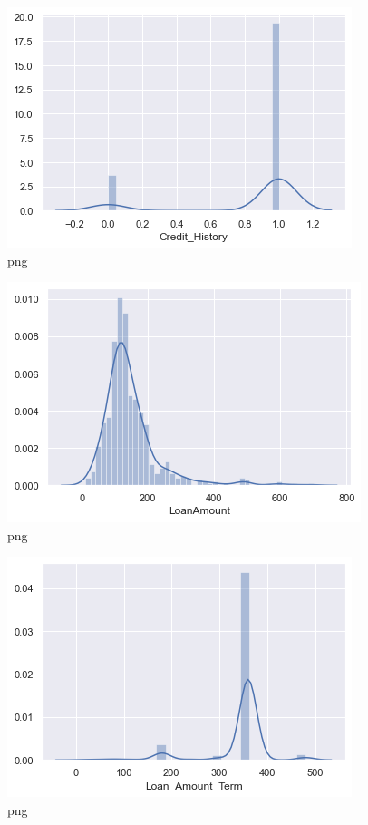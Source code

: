 \documentclass[]{article}
\begin{document}
\begin{figure}
\centering
\includegraphics{notebook_files/notebook_21_8.png}
\caption{png}
\end{figure}

\begin{figure}
\centering
\includegraphics{notebook_files/notebook_21_9.png}
\caption{png}
\end{figure}

\begin{figure}
\centering
\includegraphics{notebook_files/notebook_21_10.png}
\caption{png}
\end{figure}
\end{document}
